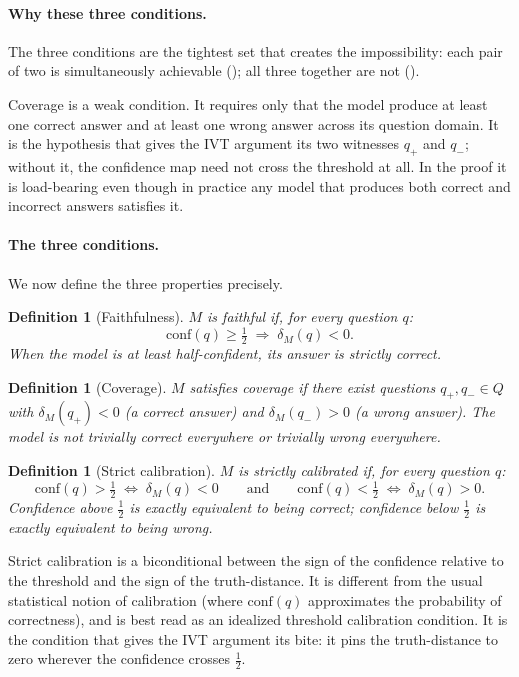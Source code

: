 \documentclass[10pt]{article}
\newtheorem{definition}[theorem]{Definition}
\newcommand{\conf}{\mathrm{conf}}
\begin{document}
\paragraph{Why these three conditions.}
The three conditions are the tightest set that creates the impossibility:
each pair of two is simultaneously achievable ();
all three together are not ().

Coverage is a weak condition. It requires only that the model produce at
least one correct answer and at least one wrong answer across its question
domain. It is the hypothesis that gives the IVT argument its two witnesses
$q_+$ and $q_-$; without it, the confidence map need not cross the threshold
at all. In the proof it is load-bearing even though in practice any
model that produces both correct and incorrect answers satisfies it.

\paragraph{The three conditions.}
We now define the three properties precisely.

\begin{definition}[Faithfulness]
\label{def:faithful}
$M$ is \emph{faithful} if, for every question $q$:
\[
  \conf(q) \geq \tfrac{1}{2} \;\Longrightarrow\; \delta_M(q) < 0.
\]
When the model is at least half-confident, its answer is strictly correct.
\end{definition}

\begin{definition}[Coverage]
\label{def:covering}
$M$ satisfies \emph{coverage} if there exist questions $q_+, q_- \in Q$
with $\delta_M(q_+) < 0$ (a correct answer) and $\delta_M(q_-) > 0$
(a wrong answer). The model is not trivially correct everywhere or
trivially wrong everywhere.
\end{definition}

\begin{definition}[Strict calibration]
\label{def:calibrated}
$M$ is \emph{strictly calibrated} if, for every question $q$:
\[
  \conf(q) > \tfrac{1}{2} \;\iff\; \delta_M(q) < 0
  \qquad\text{and}\qquad
  \conf(q) < \tfrac{1}{2} \;\iff\; \delta_M(q) > 0.
\]
Confidence above $\tfrac{1}{2}$ is exactly equivalent to being correct;
confidence below $\tfrac{1}{2}$ is exactly equivalent to being wrong.
\end{definition}

Strict calibration is a biconditional between the sign of the confidence
relative to the threshold and the sign of the truth-distance. It is different
from the usual statistical notion of calibration (where $\conf(q)$ approximates
the probability of correctness), and is best read as an idealized threshold
calibration condition. It is the condition that gives the IVT argument its
bite: it pins the truth-distance to zero wherever the confidence crosses
$\tfrac{1}{2}$.
\end{document}
